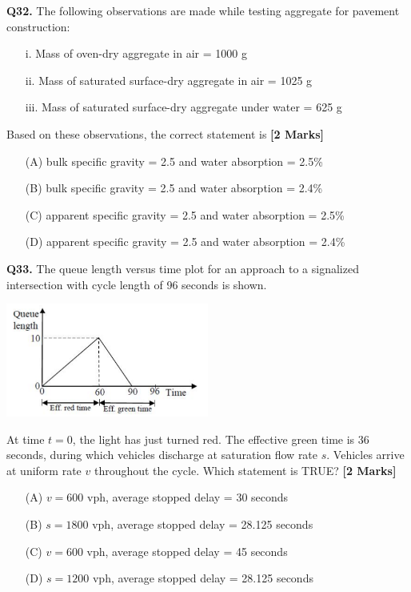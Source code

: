 \documentclass[11pt]{article}
\newcommand{\questionb}[2]{
    \noindent\textbf{Q#2.} #1 \hfill \textbf{[2 Marks]}
}
\begin{document}
\questionb{The following observations are made while testing aggregate for pavement construction:
\begin{itemize}
    \item[i.] Mass of oven-dry aggregate in air = 1000 g
    \item[ii.] Mass of saturated surface-dry aggregate in air = 1025 g
    \item[iii.] Mass of saturated surface-dry aggregate under water = 625 g
\end{itemize}
Based on these observations, the correct statement is}{32}
\begin{enumerate}
    \item[(A)] bulk specific gravity = 2.5 and water absorption = 2.5\%
    \item[(B)] bulk specific gravity = 2.5 and water absorption = 2.4\%
    \item[(C)] apparent specific gravity = 2.5 and water absorption = 2.5\%
    \item[(D)] apparent specific gravity = 2.5 and water absorption = 2.4\%
\end{enumerate}

\vspace{0.5cm}

\questionb{The queue length versus time plot for an approach to a signalized intersection with cycle length of 96 seconds is shown.
\begin{center}
\includegraphics[width=0.5\textwidth]{figures/33.png}
\end{center}
At time $t = 0$, the light has just turned red. The effective green time is 36 seconds, during which vehicles discharge at saturation flow rate $s$. Vehicles arrive at uniform rate $v$ throughout the cycle. Which statement is TRUE?}{33}
\begin{enumerate}
    \item[(A)] $v = 600$ vph, average stopped delay = 30 seconds
    \item[(B)] $s = 1800$ vph, average stopped delay = 28.125 seconds
    \item[(C)] $v = 600$ vph, average stopped delay = 45 seconds
    \item[(D)] $s = 1200$ vph, average stopped delay = 28.125 seconds
\end{enumerate}
\end{document}

